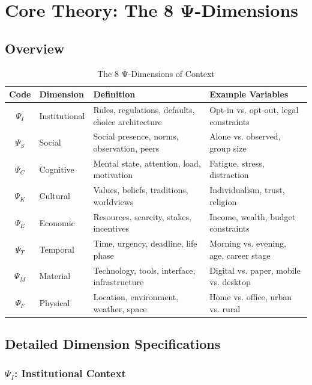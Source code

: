 \section{Core Theory: The 8 Ψ-Dimensions}
\label{sec:when-dimensions}

\subsection{Overview}

\begin{table}[htbp]
\centering
\caption{The 8 Ψ-Dimensions of Context}
\label{tab:when-psi}
\renewcommand{\arraystretch}{1.4}
\begin{tabular}{@{}clp{4.5cm}l@{}}
\toprule
\textbf{Code} & \textbf{Dimension} & \textbf{Definition} & \textbf{Example Variables} \\
\midrule
$\Psi_I$ & Institutional & Rules, regulations, defaults, choice architecture & Opt-in vs. opt-out, legal constraints \\
$\Psi_S$ & Social & Social presence, norms, observation, peers & Alone vs. observed, group size \\
$\Psi_C$ & Cognitive & Mental state, attention, load, motivation & Fatigue, stress, distraction \\
$\Psi_K$ & Cultural & Values, beliefs, traditions, worldviews & Individualism, trust, religion \\
$\Psi_E$ & Economic & Resources, scarcity, stakes, incentives & Income, wealth, budget constraints \\
$\Psi_T$ & Temporal & Time, urgency, deadline, life phase & Morning vs. evening, age, career stage \\
$\Psi_M$ & Material & Technology, tools, interface, infrastructure & Digital vs. paper, mobile vs. desktop \\
$\Psi_F$ & Physical & Location, environment, weather, space & Home vs. office, urban vs. rural \\
\bottomrule
\end{tabular}
\end{table}

\subsection{Detailed Dimension Specifications}

\subsubsection{$\Psi_I$: Institutional Context}

